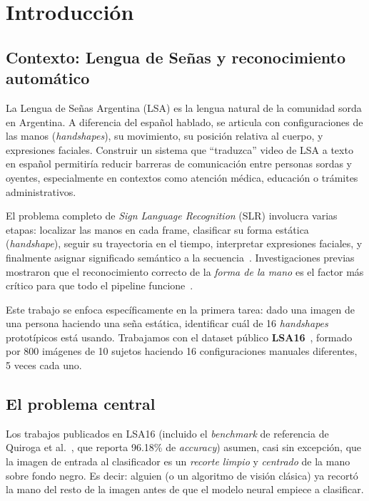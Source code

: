 \documentclass[a4paper,11pt]{article}
\begin{document}
\vspace{0.4cm}

\section{Introducción}
\label{sec:introduccion}

\subsection{Contexto: Lengua de Señas y reconocimiento automático}

La Lengua de Señas Argentina (LSA) es la lengua natural de la comunidad sorda en Argentina. A diferencia del español hablado, se articula con configuraciones de las manos (\textit{handshapes}), su movimiento, su posición relativa al cuerpo, y expresiones faciales. Construir un sistema que ``traduzca'' video de LSA a texto en español permitiría reducir barreras de comunicación entre personas sordas y oyentes, especialmente en contextos como atención médica, educación o trámites administrativos.

El problema completo de \textit{Sign Language Recognition} (SLR) involucra varias etapas: localizar las manos en cada frame, clasificar su forma estática (\textit{handshape}), seguir su trayectoria en el tiempo, interpretar expresiones faciales, y finalmente asignar significado semántico a la secuencia~\cite{cooper2011sign}. Investigaciones previas mostraron que el reconocimiento correcto de la \emph{forma de la mano} es el factor más crítico para que todo el pipeline funcione~\cite{ronchetti2016proof}.

Este trabajo se enfoca específicamente en la primera tarea: dado una imagen de una persona haciendo una seña estática, identificar cuál de 16 \textit{handshapes} prototípicos está usando. Trabajamos con el dataset público \textbf{LSA16}~\cite{ronchetti2016probsom}, formado por 800 imágenes de 10 sujetos haciendo 16 configuraciones manuales diferentes, 5 veces cada uno.

\subsection{El problema central}

Los trabajos publicados en LSA16 (incluido el \textit{benchmark} de referencia de Quiroga et al.~\cite{quiroga2017study}, que reporta 96.18\% de \textit{accuracy}) asumen, casi sin excepción, que la imagen de entrada al clasificador es un \emph{recorte limpio} y \emph{centrado} de la mano sobre fondo negro. Es decir: alguien (o un algoritmo de visión clásica) ya recortó la mano del resto de la imagen antes de que el modelo neural empiece a clasificar.
\end{document}

